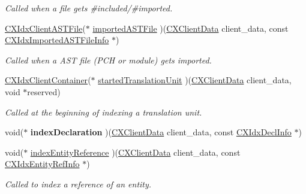 \begin{DoxyCompactItemize}
\begin{DoxyCompactList}\small\item\em Called when a file gets \#included/\#imported. \end{DoxyCompactList}\item 
\hyperlink{group__CINDEX__HIGH_ga802a69b3db636a25c5d434585fce9cbd}{C\+X\+Idx\+Client\+A\+S\+T\+File}($\ast$ \hyperlink{structIndexerCallbacks_a75672a9934f69854080bee3fbc0e3994}{imported\+A\+S\+T\+File} )(\hyperlink{group__CINDEX_gacfa40c3de26d228c0d898403c2c21612}{C\+X\+Client\+Data} client\+\_\+data, const \hyperlink{structCXIdxImportedASTFileInfo}{C\+X\+Idx\+Imported\+A\+S\+T\+File\+Info} $\ast$)
\begin{DoxyCompactList}\small\item\em Called when a A\+ST file (P\+CH or module) gets imported. \end{DoxyCompactList}\item 
\mbox{\label{structIndexerCallbacks_a11953b566658434afbe6059158a4f8ff}} 
\hyperlink{group__CINDEX__HIGH_ga0dac2cb977094bbd9d13b9d8abed278f}{C\+X\+Idx\+Client\+Container}($\ast$ \hyperlink{structIndexerCallbacks_a11953b566658434afbe6059158a4f8ff}{started\+Translation\+Unit} )(\hyperlink{group__CINDEX_gacfa40c3de26d228c0d898403c2c21612}{C\+X\+Client\+Data} client\+\_\+data, void $\ast$reserved)
\begin{DoxyCompactList}\small\item\em Called at the beginning of indexing a translation unit. \end{DoxyCompactList}\item 
\mbox{\label{structIndexerCallbacks_a322476a55bf770008d678e74f8da2eef}} 
void($\ast$ {\bfseries index\+Declaration} )(\hyperlink{group__CINDEX_gacfa40c3de26d228c0d898403c2c21612}{C\+X\+Client\+Data} client\+\_\+data, const \hyperlink{structCXIdxDeclInfo}{C\+X\+Idx\+Decl\+Info} $\ast$)
\item 
\mbox{\label{structIndexerCallbacks_a6d93809e7743a590beafa0387ac145dc}} 
void($\ast$ \hyperlink{structIndexerCallbacks_a6d93809e7743a590beafa0387ac145dc}{index\+Entity\+Reference} )(\hyperlink{group__CINDEX_gacfa40c3de26d228c0d898403c2c21612}{C\+X\+Client\+Data} client\+\_\+data, const \hyperlink{structCXIdxEntityRefInfo}{C\+X\+Idx\+Entity\+Ref\+Info} $\ast$)
\begin{DoxyCompactList}\small\item\em Called to index a reference of an entity. \end{DoxyCompactList}\end{DoxyCompactItemize}


